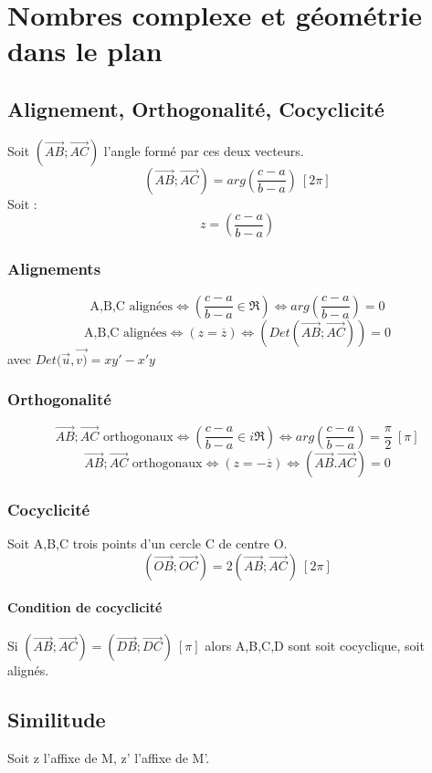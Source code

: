 \chapter{Nombres complexe et géométrie dans le plan}
\section{Alignement, Orthogonalité, Cocyclicité}
Soit $(\overrightarrow{AB};\overrightarrow{AC})$ l'angle formé par ces deux vecteurs.
$$(\overrightarrow{AB};\overrightarrow{AC}) = arg\left(\dfrac{c-a}{b-a}\right) ~ [2\pi]$$
Soit :$$z = \left(\dfrac{c-a}{b-a}\right) $$
\subsection{Alignements}
$$\mbox{A,B,C alignées} \Leftrightarrow \left(\dfrac{c-a}{b-a} \in \Re \right) \Leftrightarrow arg\left(\dfrac{c-a}{b-a}\right) = 0  $$
$$\mbox{A,B,C alignées} \Leftrightarrow (z = \overline{z}) \Leftrightarrow (Det(\overrightarrow{AB};\overrightarrow{AC})) = 0$$
avec $Det(\overrightarrow{u},\overrightarrow{v)} = xy' - x'y$ 
\subsection{Orthogonalité}
$$\overrightarrow{AB};\overrightarrow{AC} \mbox{ orthogonaux} \Leftrightarrow \left(\dfrac{c-a}{b-a} \in i\Re \right) \Leftrightarrow arg\left(\dfrac{c-a}{b-a}\right) = \dfrac{\pi}{2}~ [\pi]  $$
$$\overrightarrow{AB};\overrightarrow{AC} \mbox{ orthogonaux} \Leftrightarrow (z = -\overline{z}) \Leftrightarrow (\overrightarrow{AB}.\overrightarrow{AC}) = 0$$
\subsection{Cocyclicité}
Soit A,B,C trois points d'un cercle C de centre O.
$$(\overrightarrow{OB};\overrightarrow{OC}) = 2(\overrightarrow{AB};\overrightarrow{AC})~ [2\pi]$$
\subsubsection{Condition de cocyclicité}
\begin{prop}
 Si $(\overrightarrow{AB};\overrightarrow{AC}) = (\overrightarrow{DB};\overrightarrow{DC})~ [\pi]$ alors A,B,C,D sont soit cocyclique, soit alignés.
\end{prop}
\section{Similitude}
Soit z l'affixe de M, z' l'affixe de M'.
